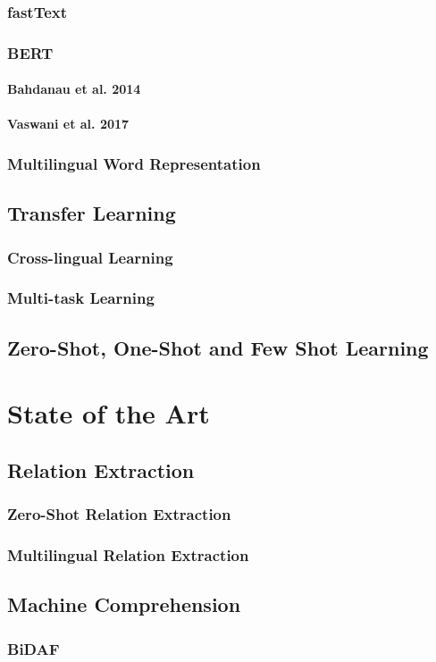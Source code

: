 \subsection{fastText}
\subsection{BERT}
\subsubsection{Bahdanau et al. 2014}
\subsubsection{Vaswani et al. 2017}


\subsection{Multilingual Word Representation}


\section{Transfer Learning}
\label{sec:transfer_learning}
\subsection{Cross-lingual Learning}
\subsection{Multi-task Learning}

\section{Zero-Shot, One-Shot and Few Shot Learning} 
\label{sec:zero_learning}

\chapter{State of the Art} %
\label{chpt:3}
\section{Relation Extraction}
\subsection{Zero-Shot Relation Extraction}
\subsection{Multilingual Relation Extraction}

\section{Machine Comprehension}
\subsection{BiDAF}
